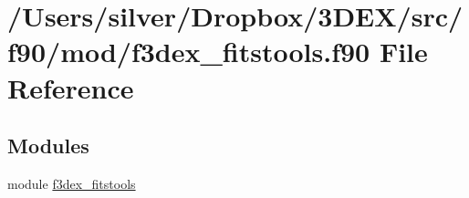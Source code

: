 \hypertarget{f3dex__fitstools_8f90}{
\section{/Users/silver/Dropbox/3DEX/src/f90/mod/f3dex\_\-fitstools.f90 File Reference}
\label{f3dex__fitstools_8f90}
}
\subsection*{Modules}
\begin{DoxyCompactItemize}
\item 
module \hyperlink{namespacef3dex__fitstools}{f3dex\_\-fitstools}
\end{DoxyCompactItemize}
